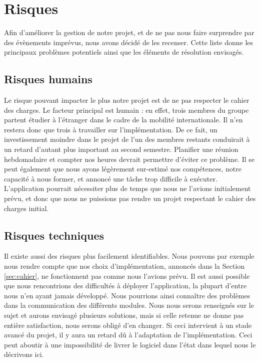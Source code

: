 \section{Risques}
		Afin d'améliorer la gestion de notre projet, et de ne pas nous faire surprendre par des évènements imprévus, nous avons décidé de les recenser. Cette liste donne les principaux problèmes potentiels ainsi que les éléments de résolution envisagés.
		
    \subsection{Risques humains}
		Le risque pouvant impacter le plus notre projet est de ne pas respecter le cahier des charges. Le facteur principal est humain : en effet, trois membres du groupe partent étudier à l'étranger dans le cadre de la mobilité internationale. Il n'en restera donc que trois à travailler sur l'implémentation. De ce fait, un investissement moindre dans le projet de l'un des membres restants conduirait à un retard d'autant plus important au second semestre. Planifier une réunion hebdomadaire et compter nos heures devrait permettre d'éviter ce problème. Il se peut également que nous ayons légèrement sur-estimé nos compétences, notre capacité à nous former, et annoncé une tâche trop difficile à exécuter. L'application pourrait nécessiter plus de temps que nous ne l'avions initialement prévu, et donc que nous ne puissions pas rendre un projet respectant le cahier des charges initial.
		
    \subsection{Risques techniques}
	    Il existe aussi des risques plus facilement identifiables. Nous pouvons par exemple nous rendre compte que nos choix d'implémentation, annoncés dans la Section \ref{sec:cahier}, ne fonctionnent pas comme nous l'avions prévu. Il est aussi possible que nous rencontrions des difficultés à déployer l'application, la plupart d'entre nous n'en ayant jamais développé. Nous pourrions ainsi connaître des problèmes dans la communication des différents modules. Nous nous serons renseignés sur le sujet et aurons envisagé plusieurs solutions, mais si celle retenue ne donne pas entière satisfaction, nous serons obligé d'en changer. Si ceci intervient à un stade avancé du projet, il y aura un retard dû à l'adaptation de l'implémentation. Ceci peut aboutir à une impossibilité de livrer le logiciel dans l'état dans lequel nous le décrivons ici.

